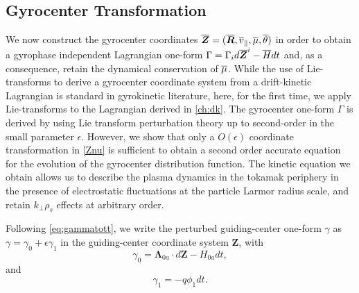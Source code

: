 \subsection{Gyrocenter Transformation}
\label{GyrocenterTransformation}

We now construct the gyrocenter coordinates $\overline{ \bm{Z}} = ( \overline{\bm{R}}, \overline{v}_{\parallel},\overline{\mu}, \overline{\theta} )$ in order to obtain a gyrophase independent Lagrangian one-form ${\Gamma} = {\Gamma}_i d \overline{ \bm{Z}}^i - \overline{H}dt$ and, as a consequence, retain the dynamical conservation of $\overline{\mu}$.
%
While the use of Lie-transforms to derive a gyrocenter coordinate system from a drift-kinetic Lagrangian is standard in gyrokinetic literature, here, for the first time, we apply Lie-transforms to the Lagrangian derived in \cref{ch:dk}.
%
The gyrocenter one-form ${\Gamma}$ is derived by using Lie transform perturbation theory up to second-order in the small parameter $\epsilon$.
%
However, we show that only a $O(\epsilon)$ coordinate transformation in \cref{Znu} is sufficient to obtain a second order accurate equation for the evolution of the gyrocenter distribution function.
%
The kinetic equation we obtain allows us to describe the plasma dynamics in the tokamak periphery in the presence of electrostatic fluctuations at the particle Larmor radius scale, and retain $k_\perp \rho_s$ effects at arbitrary order.

Following \cref{eq:gammatott}, we write the perturbed guiding-center one-form $\gamma$ as $\gamma = \gamma_0 + \epsilon \gamma_1$ in the guiding-center coordinate system $\mathbf Z$, with
%
\begin{equation}
    \gamma_{0}=\mathbf \Lambda_{0a} \cdot d \mathbf Z-H_{0a} dt,
\end{equation}
%
and
%
\begin{equation}
    \gamma_1 = - q \phi_1 dt.
\end{equation}

